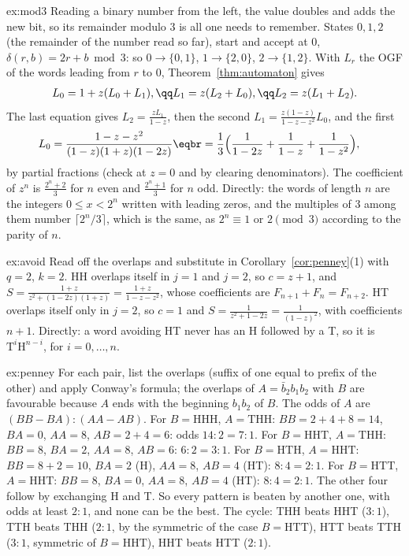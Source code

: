 \begin{solution}{ex:mod3}
\idea Reading a binary number from the left, the value doubles and adds the new bit, so its remainder modulo $3$ is all one needs to
remember.
\writeup States $0,1,2$ (the remainder of the number read so far), start and accept at $0$, $\delta(r,b)=2r+b\bmod3$: so $0\to\{0,1\}$, $1\to\{2,0\}$,
$2\to\{1,2\}$. With $L_r$ the OGF of the words leading from $r$ to $0$, Theorem~\ref{thm:automaton} gives
\[
\begin{gathered}L_0=1+z(L_0+L_1),\qq L_1=z(L_2+L_0),\qq L_2=z(L_1+L_2).\end{gathered}
\]
The last equation gives $L_2=\frac{zL_1}{1-z}$, then the second $L_1=\frac{z(1-z)}{1-z-z^2}L_0$, and the first
\[
\begin{aligned}{}&L_0=\frac{1-z-z^2}{(1-z)(1+z)(1-2z)}\eqbr=\frac13\Big(\frac1{1-2z}+\frac1{1-z}+\frac1{1-z^2}\Big),\end{aligned}
\]
by partial fractions (check at $z=0$ and by clearing denominators). The coefficient of $z^n$ is $\frac{2^n+2}3$ for $n$ even and $\frac{2^n+1}3$ for $n$ odd. Directly: the
words of length $n$ are the integers $0\le x<2^n$ written with leading zeros, and the multiples of $3$ among them number $\lceil2^n/3\rceil$, which is the
same, as $2^n\equiv1$ or $2\pmod3$ according to the parity of $n$.
\end{solution}

\begin{solution}{ex:avoid}
\idea Read off the overlaps and substitute in Corollary~\ref{cor:penney}(1) with $q=2$, $k=2$.
\writeup HH overlaps itself in $j=1$ and $j=2$, so $c=z+1$, and $S=\frac{1+z}{z^2+(1-2z)(1+z)}=\frac{1+z}{1-z-z^2}$, whose coefficients are $F_{n+1}+F_n=F_{n+2}$. HT overlaps itself
only in $j=2$, so $c=1$ and $S=\frac1{z^2+1-2z}=\frac1{(1-z)^2}$, with coefficients $n+1$. Directly: a word avoiding HT never has an H followed by a T, so it is
$\mathrm T^i\mathrm H^{n-i}$, for $i=0,\dots,n$.
\end{solution}

\begin{solution}{ex:penney}
\idea For each pair, list the overlaps (suffix of one equal to prefix of the other) and apply Conway's formula; the overlaps
of $A=\bar b_2b_1b_2$ with $B$ are favourable because $A$ ends with the beginning $b_1b_2$ of $B$.
\writeup The odds of $A$ are $(BB-BA):(AA-AB)$. For $B=\mathrm{HHH}$, $A=\mathrm{THH}$: $BB=2+4+8=14$, $BA=0$, $AA=8$, $AB=2+4=6$: odds $14:2=7:1$. For $B=\mathrm{HHT}$,
$A=\mathrm{THH}$: $BB=8$, $BA=2$, $AA=8$, $AB=6$: $6:2=3:1$. For $B=\mathrm{HTH}$, $A=\mathrm{HHT}$: $BB=8+2=10$, $BA=2$ (H), $AA=8$, $AB=4$ (HT): $8:4=2:1$. For $B=\mathrm{HTT}$,
$A=\mathrm{HHT}$: $BB=8$, $BA=0$, $AA=8$, $AB=4$ (HT): $8:4=2:1$. The other four follow by exchanging H and T. So every pattern is beaten by another one,
with odds at least $2:1$, and none can be the best. The cycle: THH beats HHT ($3:1$), TTH beats THH ($2:1$, by the symmetric of the case $B=\mathrm{HTT}$),
HTT beats TTH ($3:1$, symmetric of $B=\mathrm{HHT}$), HHT beats HTT ($2:1$).
\end{solution}

